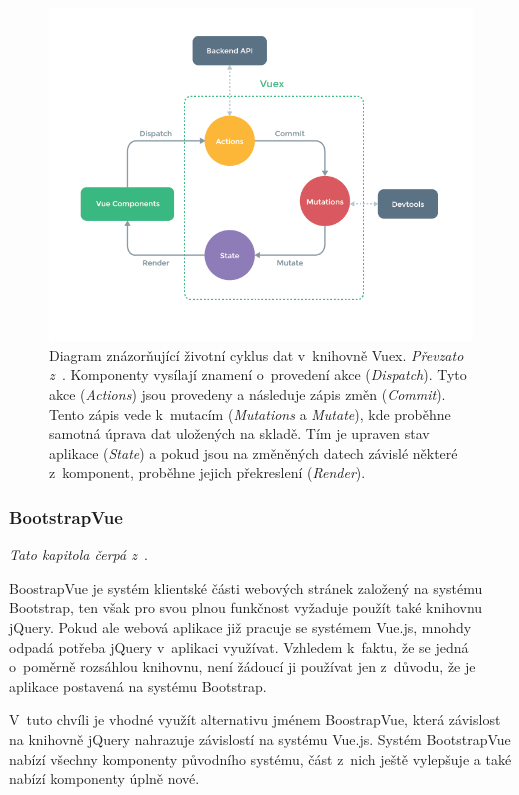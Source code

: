 \begin{figure}[H]
	\centering
	\includegraphics[width=\textwidth]{obrazky-figures/vuex.png}
	\caption{Diagram znázorňující životní cyklus dat v~knihovně Vuex. \emph{Převzato z~\cite{bib:vuex-doc}}. Komponenty vysílají znamení o~provedení akce (\emph{Dispatch}). Tyto akce (\emph{Actions}) jsou provedeny a následuje zápis změn (\emph{Commit}). Tento zápis vede k~mutacím (\emph{Mutations} a \emph{Mutate}), kde proběhne samotná úprava dat uložených na skladě. Tím je upraven stav aplikace (\emph{State}) a pokud jsou na změněných datech závislé některé z~komponent, proběhne jejich překreslení (\emph{Render}).}
	\label{img:vuex-dataflow}
\end{figure}



\subsubsection*{BootstrapVue}
\emph{Tato kapitola čerpá z~\cite{bib:bootstrap-vue}}.

BoostrapVue je systém klientské části webových stránek založený na systému Bootstrap, ten však pro svou plnou funkčnost vyžaduje použít také knihovnu jQuery. Pokud ale webová aplikace již pracuje se systémem Vue.js, mnohdy odpadá potřeba jQuery v~aplikaci využívat. Vzhledem k~faktu, že se jedná o~poměrně rozsáhlou knihovnu, není žádoucí ji používat jen z~důvodu, že je aplikace postavená na systému Bootstrap.

V~tuto chvíli je vhodné využít alternativu jménem BoostrapVue, která závislost na knihovně jQuery nahrazuje závislostí na systému Vue.js. Systém BootstrapVue nabízí všechny komponenty původního systému, část z~nich ještě vylepšuje a také nabízí komponenty úplně nové.

